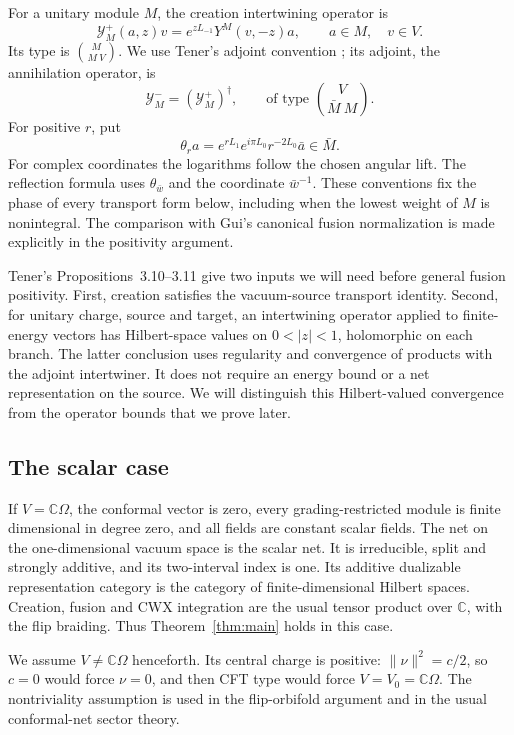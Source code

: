 For a unitary module $M$, the creation intertwining operator is
\begin{equation}\label{eq:creation}
 \mathcal Y_M^+(a,z)v=e^{zL_{-1}}Y^M(v,-z)a,
 \qquad a\in M,\quad v\in V.
\end{equation}
Its type is $\binom{M}{M\ V}$. We use Tener's adjoint convention \cite[Section~2 and Proposition~3.10]{TenerFusion}; its adjoint, the annihilation operator, is
\[
 \mathcal Y_M^-=(\mathcal Y_M^+)^\dagger,
 \qquad\text{of type }\binom{V}{\bar M\ M}.
\]
For positive $r$, put
\begin{equation}\label{eq:theta-convention}
 \theta_r a=e^{rL_1}e^{i\pi L_0}r^{-2L_0}\bar a\in\bar M.
\end{equation}
For complex coordinates the logarithms follow the chosen angular lift. The reflection formula uses $\theta_{\bar w}$ and the coordinate $\bar w^{-1}$. These conventions fix the phase of every transport form below, including when the lowest weight of $M$ is nonintegral. The comparison with Gui's canonical fusion normalization is made explicitly in the positivity argument.

Tener's Propositions~3.10--3.11 \cite{TenerFusion} give two inputs we will need before general fusion positivity. First, creation satisfies the vacuum-source transport identity. Second, for unitary charge, source and target, an intertwining operator applied to finite-energy vectors has Hilbert-space values on $0<|z|<1$, holomorphic on each branch. The latter conclusion uses regularity and convergence of products with the adjoint intertwiner. It does not require an energy bound or a net representation on the source. We will distinguish this Hilbert-valued convergence from the operator bounds that we prove later.

\subsection{The scalar case}

If $V=\mathbb C\Omega$, the conformal vector is zero, every grading-restricted module is finite dimensional in degree zero, and all fields are constant scalar fields. The net on the one-dimensional vacuum space is the scalar net. It is irreducible, split and strongly additive, and its two-interval index is one. Its additive dualizable representation category is the category of finite-dimensional Hilbert spaces. Creation, fusion and CWX integration are the usual tensor product over $\mathbb C$, with the flip braiding. Thus Theorem~\ref{thm:main} holds in this case.

We assume $V\neq\mathbb C\Omega$ henceforth. Its central charge is positive: $\|\nu\|^2=c/2$, so $c=0$ would force $\nu=0$, and then CFT type would force $V=V_0=\mathbb C\Omega$. The nontriviality assumption is used in the flip-orbifold argument and in the usual conformal-net sector theory.
